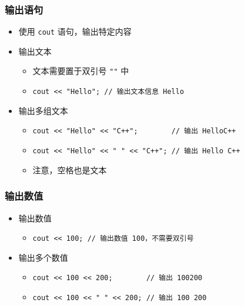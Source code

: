 \begin{frame}[fragile]
    \frametitle{输出语句}

    \begin{itemize}
        \item<1-> 使用 \lstinline|cout| 语句，输出特定内容

        \item<2-> 输出文本

            \begin{itemize}
                \item 文本需要置于双引号 \lstinline|""| 中
                \item \lstinline|cout << "Hello"; // 输出文本信息 Hello| 
            \end{itemize}

        \item<3-> 输出多组文本

            \begin{itemize}
                \item \lstinline|cout << "Hello" << "C++";        // 输出 HelloC++| 
                \item \lstinline|cout << "Hello" << " " << "C++"; // 输出 Hello C++|
                \item 注意，空格也是文本
            \end{itemize}

    \end{itemize}
\end{frame}

\begin{frame}[fragile]
    \frametitle{输出数值}

    \begin{itemize}
        \item<1-> 输出数值

            \begin{itemize}
                \item \lstinline|cout << 100; // 输出数值 100，不需要双引号| 
            \end{itemize}

        \item<2-> 输出多个数值

            \begin{itemize}
                \item
                    \lstinline|cout << 100 << 200;        // 输出 100200| 
                \item
                    \lstinline|cout << 100 << " " << 200; // 输出 100 200| 
            \end{itemize}

    \end{itemize}
\end{frame}

